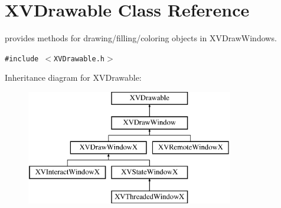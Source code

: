\hypertarget{class_XVDrawable}{
\section{XVDrawable  Class Reference}
\label{XVDrawable}
}
provides methods for drawing/filling/coloring objects in XVDraw\-Windows. 


{\tt \#include $<$XVDrawable.h$>$}

Inheritance diagram for XVDrawable:\begin{figure}[H]
\begin{center}
\leavevmode
\includegraphics[height=5cm]{class_XVDrawable}
\end{center}
\end{figure}
